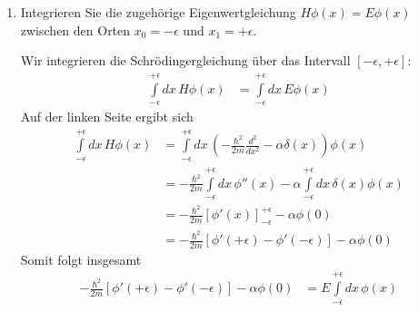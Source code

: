 \documentclass[11pt,a4paper]{scrartcl}
\begin{document}
\begin{enumerate}[label=(\alph*)]
    \item Integrieren Sie die zugehörige Eigenwertgleichung $H\phi(x) = E \phi(x)$ zwischen den Orten $x_0 = -\epsilon$ und $x_1 = +\epsilon$.
    \begin{tcolorbox}[title=Berechnung, breakable]
        Wir integrieren die Schrödingergleichung über das Intervall $[-\epsilon,+\epsilon]$:
        \begin{align*}
            \int\limits_{-\epsilon}^{+\epsilon}dx\, H \phi(x) &= \int\limits_{-\epsilon}^{+\epsilon} dx\,E \phi(x)
        \end{align*}
        Auf der linken Seite ergibt sich
        \begin{align*}
            \int\limits_{-\epsilon}^{+\epsilon}dx\, H \phi(x)
            &= \int\limits_{-\epsilon}^{+\epsilon}dx\, \left(-\frac{\hbar^2}{2m}\frac{d^2}{dx^2}-\alpha \delta(x)\right) \phi(x)\\
            &= -\frac{\hbar^2}{2m}\int\limits_{-\epsilon}^{+\epsilon}dx\,\phi''(x) -\alpha \int\limits_{-\epsilon}^{+\epsilon}dx\, \delta(x) \phi(x)\\
            &= -\frac{\hbar^2}{2m}\left[ \phi'(x)\right]_{-\epsilon}^{+\epsilon} - \alpha \phi(0)\\
            &= -\frac{\hbar^2}{2m}\left[ \phi'(+\epsilon) - \phi'(-\epsilon)\right] - \alpha \phi(0)
        \end{align*}
        Somit folgt insgesamt
        \begin{align*}
            -\frac{\hbar^2}{2m}\left[\phi'(+\epsilon) - \phi'(-\epsilon)\right] - \alpha \phi(0)
            &= E \int\limits_{-\epsilon}^{+\epsilon} dx\, \phi(x)
        \end{align*}
    \end{tcolorbox}


\end{enumerate}
\end{document}
